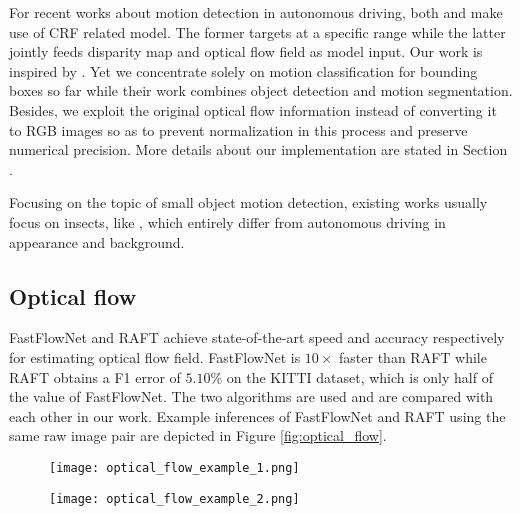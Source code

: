 \documentclass[10pt, a4paper, twocolumn]{article}
\begin{document}
    For recent works about motion detection in autonomous driving, both  \cite{9443120} and \cite{8076832} make use of CRF related model. The former targets at a specific range while the latter jointly feeds disparity map and optical flow field as model input. Our work is inspired by \cite{8569744}. Yet we concentrate solely on motion classification for bounding boxes so far while their work combines object detection and motion segmentation. Besides, we exploit the original optical flow information instead of converting it to RGB images so as to prevent normalization in this process and preserve numerical precision. More details about our implementation are stated in Section .
    
    Focusing on the topic of small object motion detection, existing works usually focus on insects, like \cite{DBLP:journals/corr/abs-1805-00342}\cite{rs13040653}, which entirely differ from autonomous driving in appearance and background.

\subsection{\normalsize Optical flow}

    FastFlowNet \cite{Kong:2021:FastFlowNet} and RAFT \cite{DBLP:journals/corr/abs-2003-12039} achieve state-of-the-art speed and accuracy respectively for estimating optical flow field. FastFlowNet is $10\times$ faster than RAFT while RAFT obtains a F1 error of $5.10\%$ on the KITTI \cite{Geiger2013IJRR} dataset, which is only half of the value of FastFlowNet. The two algorithms are used and are compared with each other in our work. Example inferences of FastFlowNet and RAFT using the same raw image pair are depicted in Figure \ref{fig:optical_flow}.

    \begin{figure*}[t!]
        \centering
        \begin{subfigure}{.8\textwidth}
            \centering
            \texttt{[image: optical\_flow\_example\_1.png]}
        \end{subfigure}
        \par\smallskip
        \begin{subfigure}{.8\textwidth}
        \centering
        \texttt{[image: optical\_flow\_example\_2.png]}
        \end{subfigure}
    \caption{Examples of optical flow predictions on the nuScenes dataset. From left to right: the preceding raw image of a keyframe pairs, flow visualization of FastFlowNet and RAFT.}
    \label{fig:optical_flow}
    \end{figure*}
    
\end{document}
